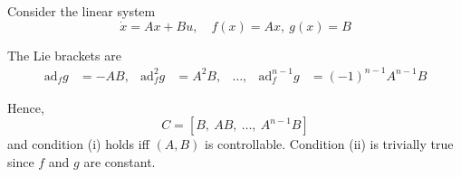 \begin{example}[Example]
Consider the linear system
\begin{equation}
\dot{x} = A x + B u, \quad f(x) = A x, \ g(x) = B
\end{equation}

The Lie brackets are
\begin{align}
\text{ad}_f g &= -A B, &
\text{ad}_f^2 g &= A^2 B, &
\dots, &
\text{ad}_f^{n-1} g &= (-1)^{n-1} A^{n-1}B
\end{align}

Hence,
\[
C = [B,~ AB,~ \dots,~ A^{n-1}B]
\]
and condition (i) holds iff $(A,B)$ is controllable.  
Condition (ii) is trivially true since $f$ and $g$ are constant.
\end{example}

